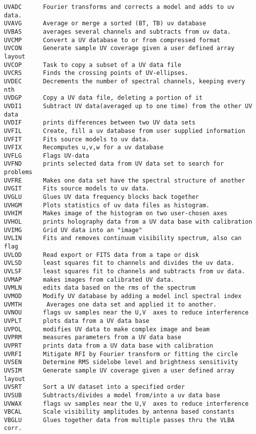 \begin{verbatim}
UVADC      Fourier transforms and corrects a model and adds to uv data.
UVAVG      Average or merge a sorted (BT, TB) uv database
UVBAS      averages several channels and subtracts from uv data.
UVCMP      Convert a UV database to or from compressed format
UVCON      Generate sample UV coverage given a user defined array layout
UVCOP      Task to copy a subset of a UV data file
UVCRS      Finds the crossing points of UV-ellipses.
UVDEC      Decrements the number of spectral channels, keeping every nth
UVDGP      Copy a UV data file, deleting a portion of it
UVDI1      Subtract UV data(averaged up to one time) from the other UV data
UVDIF      prints differences between two UV data sets
UVFIL      Create, fill a uv database from user supplied information
UVFIT      Fits source models to uv data.
UVFIX      Recomputes u,v,w for a uv database
UVFLG      Flags UV-data
UVFND      prints selected data from UV data set to search for problems
UVFRE      Makes one data set have the spectral structure of another
UVGIT      Fits source models to uv data.
UVGLU      Glues UV data frequency blocks back together
UVHGM      Plots statistics of uv data files as histogram.
UVHIM      Makes image of the histogram on two user-chosen axes
UVHOL      prints holography data from a UV data base with calibration
UVIMG      Grid UV data into an "image"
UVLIN      Fits and removes continuum visibility spectrum, also can flag
UVLOD      Read export or FITS data from a tape or disk
UVLSD      least squares fit to channels and divides the uv data.
UVLSF      least squares fit to channels and subtracts from uv data.
UVMAP      makes images from calibrated UV data.
UVMLN      edits data based on the rms of the spectrum
UVMOD      Modify UV database by adding a model incl spectral index
UVMTH       Averages one data set and applied it to another.
UVNOU      flags uv samples near the U,V  axes to reduce interference
UVPLT      plots data from a UV data base
UVPOL      modifies UV data to make complex image and beam
UVPRM      measures parameters from a UV data base
UVPRT      prints data from a UV data base with calibration
UVRFI      Mitigate RFI by Fourier transform or fitting the circle
UVSEN      Determine RMS sidelobe level and brightness sensitivity
UVSIM      Generate sample UV coverage given a user defined array layout
UVSRT      Sort a UV dataset into a specified order
UVSUB      Subtracts/divides a model from/into a uv data base
UVWAX      flags uv samples near the U,V  axes to reduce interference
VBCAL      Scale visibility amplitudes by antenna based constants
VBGLU      Glues together data from multiple passes thru the VLBA corr.

\end{verbatim}
